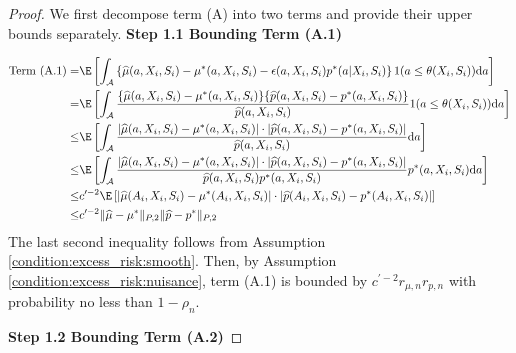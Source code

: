 \begin{proof}
\noindent We first decompose term (A) into two terms and provide their upper bounds separately.
\noindent \textbf{Step 1.1 Bounding Term (A.1)}

\noindent 

\begin{align*}
    \text{Term (A.1)} =& \E\left[\int_{\mathcal{A}} \left\{\widehat{\mu}(a,X_i,S_i) - \mu^*(a,X_i,S_i) - \epsilon(a,X_i,S_i)p^*(a|X_i,S_i)\right\}1(a\leq \theta(X_i,S_i))\mathrm{d}a\right]\\
    = & \E\left[\int_{\mathcal{A}} \frac{\{\widehat{\mu}(a,X_i,S_i) - \mu^*(a,X_i,S_i)\}\{\widehat{p}(a,X_i,S_i) - p^*(a,X_i,S_i)\}}{\widehat{p}(a,X_i,S_i)}1(a\leq \theta(X_i,S_i))\mathrm{d}a\right]\\
    \leq & \E\left[\int_{\mathcal{A}} \frac{|\widehat{\mu}(a,X_i,S_i) - \mu^*(a,X_i,S_i)|\cdot|\widehat{p}(a,X_i,S_i) - p^*(a,X_i,S_i)|}{\widehat{p}(a,X_i,S_i)}\mathrm{d}a\right]\\
    \leq &\E\left[\int_{\mathcal{A}} \frac{|\widehat{\mu}(a,X_i,S_i) - \mu^*(a,X_i,S_i)|\cdot|\widehat{p}(a,X_i,S_i) - p^*(a,X_i,S_i)|}{\widehat{p}(a,X_i,S_i)p^*(a,X_i,S_i)}p^*(a,X_i,S_i)\mathrm{d}a\right]\\
    \leq & c^{\prime-2}\E\left[|\widehat{\mu}(A_i,X_i,S_i) - \mu^*(A_i,X_i,S_i)|\cdot|\widehat{p}(A_i,X_i,S_i) - p^*(A_i,X_i,S_i)|\right]
    \\  
    \leq & c^{\prime-2}\|\widehat{\mu} - \mu^*\|_{P,2} \|\widehat{p} - p^*\|_{P,2}
\end{align*}
The last second inequality follows from Assumption \ref{condition:excess_risk:smooth}. Then, by Assumption \ref{condition:excess_risk:nuisance}, term (A.1) is bounded by $c^{\prime-2}r_{\mu,n}r_{p,n}$ with probability no less than $1-\rho_n$.


\noindent \textbf{Step 1.2 Bounding Term (A.2)}


\end{proof}
